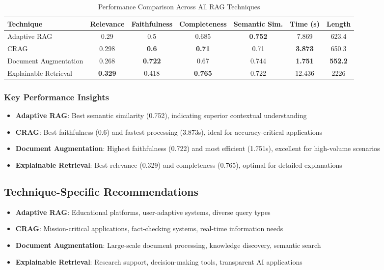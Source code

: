 \documentclass[12pt,a4paper]{article}
\begin{document}
\begin{table}[H]
\centering
\begin{tabular}{|l|c|c|c|c|c|c|}
\hline
\textbf{Technique} & \textbf{Relevance} & \textbf{Faithfulness} & \textbf{Completeness} & \textbf{Semantic Sim.} & \textbf{Time (s)} & \textbf{Length} \\
\hline
Adaptive RAG & 0.29 & 0.5 & 0.685 & \textbf{0.752} & 7.869 & 623.4 \\
CRAG & 0.298 & \textbf{0.6} & \textbf{0.71} & 0.71 & \textbf{3.873} & 650.3 \\
Document Augmentation & 0.268 & \textbf{0.722} & 0.67 & 0.744 & \textbf{1.751} & \textbf{552.2} \\
Explainable Retrieval & \textbf{0.329} & 0.418 & \textbf{0.765} & 0.722 & 12.436 & 2226 \\
\hline
\end{tabular}
\caption{Performance Comparison Across All RAG Techniques}
\end{table}

\subsubsection{Key Performance Insights}

\begin{itemize}
    \item \textbf{Adaptive RAG}: Best semantic similarity (0.752), indicating superior contextual understanding
    \item \textbf{CRAG}: Best faithfulness (0.6) and fastest processing (3.873s), ideal for accuracy-critical applications
    \item \textbf{Document Augmentation}: Highest faithfulness (0.722) and most efficient (1.751s), excellent for high-volume scenarios
    \item \textbf{Explainable Retrieval}: Best relevance (0.329) and completeness (0.765), optimal for detailed explanations
\end{itemize}

\subsection{Technique-Specific Recommendations}

\begin{itemize}
    \item \textbf{Adaptive RAG}: Educational platforms, user-adaptive systems, diverse query types
    \item \textbf{CRAG}: Mission-critical applications, fact-checking systems, real-time information needs
    \item \textbf{Document Augmentation}: Large-scale document processing, knowledge discovery, semantic search
    \item \textbf{Explainable Retrieval}: Research support, decision-making tools, transparent AI applications
\end{itemize}
\end{document}
